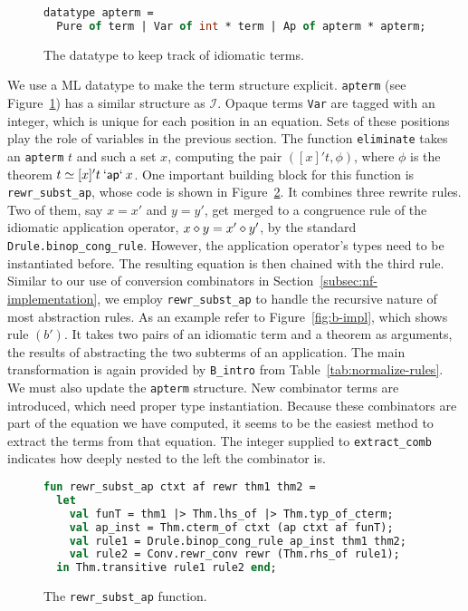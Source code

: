 \begin{figure}[h]
\begin{lstlisting}[language=ML]
datatype apterm =
  Pure of term | Var of int * term | Ap of apterm * apterm;
\end{lstlisting}
\caption{The datatype to keep track of idiomatic terms.}
\label{fig:apterm}
\end{figure}

We use a ML datatype to make the term structure explicit.
\texttt{apterm} (see Figure~\ref{fig:apterm}) has a similar structure as $\mathcal{I}$.
Opaque terms \texttt{Var} are tagged with an integer, which is unique for each
position in an equation.
Sets of these positions play the role of variables in the previous section.
The function \texttt{eliminate} takes an \texttt{apterm} $t$ and such a set $x$,
computing the pair $([x]'t,\phi)$, where $\phi$ is the theorem
$t \simeq [x]'t \mathbin{\mathsf{`ap`}} x$.
One important building block for this function is \texttt{rewr\_subst\_ap},
whose code is shown in Figure~\ref{fig:rewr-subst-ap}.
It combines three rewrite rules.
Two of them, say $x = x'$ and $y = y'$, get merged to a congruence rule of the
idiomatic application operator, $x \diamond y = x' \diamond y'$, by the standard
\texttt{Drule.binop\_cong\_rule}.
However, the application operator's types need to be instantiated before.
The resulting equation is then chained with the third rule.
Similar to our use of conversion combinators in Section~\ref{subsec:nf-implementation},
we employ \texttt{rewr\_subst\_ap} to handle the recursive nature of most
abstraction rules.
As an example refer to Figure~\ref{fig:b-impl}, which shows rule $(b')$.
It takes two pairs of an idiomatic term and a theorem as arguments, the results
of abstracting the two subterms of an application.
The main transformation is again provided by \texttt{B\_intro} from
Table~\ref{tab:normalize-rules}.
We must also update the \texttt{apterm} structure.
New combinator terms are introduced, which need proper type instantiation.
Because these combinators are part of the equation we have computed, it seems
to be the easiest method to extract the terms from that equation.
The integer supplied to \texttt{extract\_comb} indicates how deeply nested to
the left the combinator is.

\begin{figure}[t]
\begin{lstlisting}[language=ML]
fun rewr_subst_ap ctxt af rewr thm1 thm2 =
  let
    val funT = thm1 |> Thm.lhs_of |> Thm.typ_of_cterm;
    val ap_inst = Thm.cterm_of ctxt (ap ctxt af funT);
    val rule1 = Drule.binop_cong_rule ap_inst thm1 thm2;
    val rule2 = Conv.rewr_conv rewr (Thm.rhs_of rule1);
  in Thm.transitive rule1 rule2 end;
\end{lstlisting}
\caption{The \texttt{rewr\_subst\_ap} function.}
\label{fig:rewr-subst-ap}
\end{figure}

